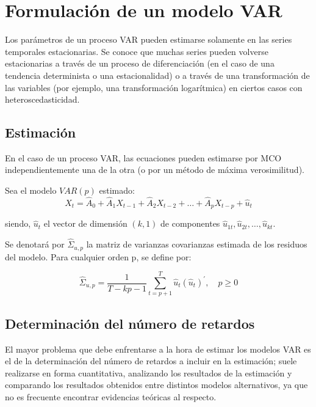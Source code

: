 \section{Formulaci\'{o}n de un modelo VAR}
\label{subsec:mylabel7}

Los par\'{a}metros de un proceso VAR pueden estimarse solamente en las series temporales estacionarias. Se conoce que muchas series pueden volverse estacionarias a trav\'{e}s de un proceso de diferenciaci\'{o}n (en el caso de una tendencia determinista o una estacionalidad) o a trav\'{e}s de una transformaci\'{o}n de las variables (por ejemplo, una transformaci\'{o}n logar\'{i}tmica) en ciertos casos con heteroscedasticidad.

\subsection{Estimaci\'{o}n}
\label{subsubsec:mylabel9}

En el caso de un proceso VAR, las ecuaciones pueden estimarse por MCO independientemente una de la otra (o por un m\'{e}todo de m\'{a}xima verosimilitud).\newline

Sea el modelo $VAR(p)$ estimado:
\[
X_{t}=\hat{A}_{0}+\hat{A}_{1}X_{t-1}+\hat{A}_{2}X_{t-2}+\ldots +\hat{A}_{p}X_{t-p}+\hat{u}_{t}
\]

siendo, $\hat{u}_{t}$ el vector de dimensi\'{o}n $(k,1)$ de componentes $\hat{u}_{1t}, \hat{u}_{2t}, \ldots ,\hat{u}_{kt}$.\newline

Se denotar\'{a} por $\displaystyle\hat{\Sigma }_{u,p}$ la matriz de varianzas covarianzas estimada de los residuos del modelo. Para cualquier orden p, se define por:

\[
\displaystyle\hat{\Sigma }_{u,p}=\frac{1}{T-kp-1}\sum_{t=p+1}^T \hat{u}_{t} \left( \hat{u}_{t} \right)^{'},\quad p\ge 0
\]

\subsection{Determinaci\'{o}n del n\'{u}mero de retardos}
\label{subsubsec:mylabel10}

El mayor problema que debe enfrentarse a la hora de estimar los modelos VAR es el de la determinaci\'{o}n del n\'{u}mero de retardos a incluir en la estimaci\'{o}n; suele realizarse en forma cuantitativa, analizando los resultados de la estimaci\'{o}n y comparando los resultados obtenidos entre distintos modelos alternativos, ya que no es frecuente encontrar evidencias te\'{o}ricas al respecto.\newline

